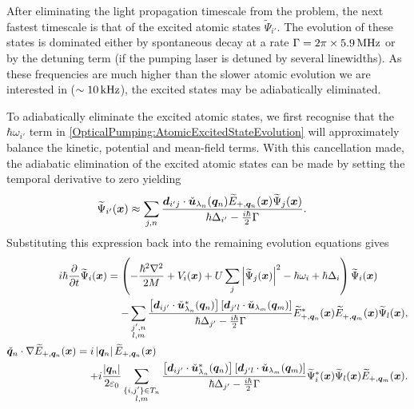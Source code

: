After eliminating the light propagation timescale from the problem, the next fastest timescale is that of the excited atomic states $\widetilde{\Psi}_{i'}$.  The evolution of these states is dominated either by spontaneous decay at a rate $\Gamma = 2\pi \times \unit[5.9]{MHz}$ or by the detuning term (if the pumping laser is detuned by several linewidths).  As these frequencies are much higher than the slower atomic evolution we are interested in ($\sim\unit[10]{kHz}$), the excited states may be adiabatically eliminated.  

To adiabatically eliminate the excited atomic states, we first recognise that the $\hbar \omega_{i'}$ term in \eqref{OpticalPumping:AtomicExcitedStateEvolution} will approximately balance the kinetic, potential and mean-field terms.  With this cancellation made, the adiabatic elimination of the excited atomic states can be made by setting the temporal derivative to zero yielding
\begin{align}
    \widetilde{\Psi}_{i'}(\bm{x}) &\approx \sum_{j, n} \frac{ \bm{d}_{i' j}\cdot \check{\bm{u}}_{\lambda_n}(\bm{q}_n) \widetilde{E}_{+, \bm{q}_n}(\bm{x}) \widetilde{\Psi}_j(\bm{x})}{\hbar \Delta_{i'} - \frac{i \hbar}{2}\Gamma}.
\end{align}
Substituting this expression back into the remaining evolution equations gives
\begin{subequations}
    \label{OpticalPumping:GeneralMultimodeModel}
    \begin{align}
        \begin{split}
            i \hbar \frac{\partial}{\partial t} \widetilde{\Psi}_i(\vect{x}) &= \left( -\frac{\hbar^2 \nabla^2}{2M} + V_i(\vect{x}) + U \sum_j \abs{\widetilde{\Psi}_j(\vect{x})}^2 - \hbar \omega_{i} + \hbar \Delta_i \right) \widetilde{\Psi}_i(\vect{x})\\
            &\relphantom{=} - \sum_{\substack{j',n\\ l,m}}  \frac{ \left[\vect{d}_{ij'} \cdot \unitvec{u}^*_{\lambda_n}(\vect{q}_n) \right]\left[\vect{d}_{j'l} \cdot \unitvec{u}_{\lambda_m}(\vect{q}_m)\right] }{\hbar \Delta_{j'} - \frac{i \hbar}{2}\Gamma} \widetilde{E}_{+,\vect{q}_n}^*(\vect{x}) \widetilde{E}^{\phantom{*}}_{+, \vect{q}_m}(\vect{x}) \widetilde{\Psi}_{l}(\vect{x}),
        \end{split}\\
        \begin{split}
            \unitvec{q}_n \cdot \nabla \widetilde{E}_{+, \vect{q}_n}(\vect{x}) &= i \abs{\vect{q}_n} \widetilde{E}_{+, \vect{q}_n}(\vect{x}) \\
            &\relphantom{=} + i \frac{\abs{\vect{q}_n}}{2 \varepsilon_0} \sum_{\substack{\{i,j'\}\in T_n\\ l, m}} \frac{\left[\vect{d}_{ij'}\cdot\unitvec{u}^*_{\lambda_n}(\vect{q}_n)\right] \left[\vect{d}_{j' l}\cdot \unitvec{u}_{\lambda_m}(\vect{q}_m)\right] }{\hbar \Delta_{j'} - \frac{i \hbar}{2}\Gamma}  \widetilde{\Psi}^*_i(\vect{x}) \widetilde{\Psi}_l(\vect{x}) \widetilde{E}_{+, \vect{q}_m}(\vect{x}).
        \end{split}
    \end{align}
\end{subequations}

